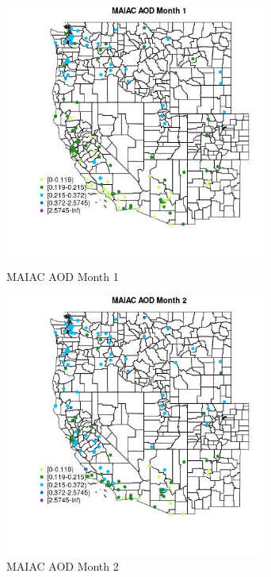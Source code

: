 \begin{figure} 
\centering  
\includegraphics[width=0.77\textwidth]{Code_Outputs/Report_ML_input_PM25_Step4_part_e_de_duplicated_aves_MapObsMo1MAIAC_AOD.jpg} 
\caption{\label{fig:Report_ML_input_PM25_Step4_part_e_de_duplicated_avesMapObsMo1MAIAC_AOD}MAIAC AOD Month 1} 
\end{figure} 
 

\begin{figure} 
\centering  
\includegraphics[width=0.77\textwidth]{Code_Outputs/Report_ML_input_PM25_Step4_part_e_de_duplicated_aves_MapObsMo2MAIAC_AOD.jpg} 
\caption{\label{fig:Report_ML_input_PM25_Step4_part_e_de_duplicated_avesMapObsMo2MAIAC_AOD}MAIAC AOD Month 2} 
\end{figure} 
 

